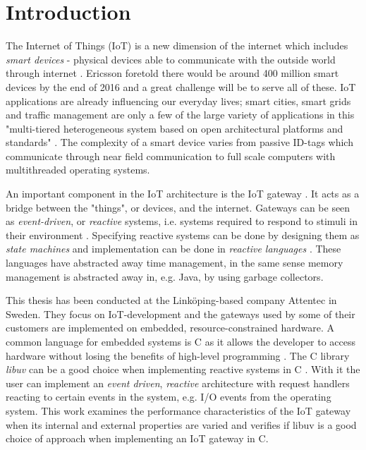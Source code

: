 \chapter{Introduction}
\label{cha:introduction}

The Internet of Things (IoT) is a new dimension of the internet which includes
\textit{smart devices} - physical devices able to communicate with the outside
world through internet
\cite{design-principles-for-distributed-embedded-applications}
\cite{wu2011m2m}. Ericsson foretold there would be around 400 million smart
devices by the end of 2016 \cite{ericsson-iot-forecast} and a great challenge
will be to serve all of these. IoT applications are already influencing our
everyday lives; smart cities, smart grids and traffic management are only a few
of the large variety of applications in this "multi-tiered heterogeneous system
based on open architectural platforms and standards" \cite{gardavsevic2017iot}.
The complexity of a smart device varies from passive ID-tags which communicate
through near field communication to full scale computers with multithreaded
operating systems.

An important component in the IoT architecture is the IoT gateway
\cite{chen2011brief}. It acts as a bridge between the "things", or devices, and
the internet. Gateways can be seen as \textit{event-driven}, or
\textit{reactive} systems, i.e. systems required to respond to stimuli in their
environment \cite{garlan1993introduction} \cite{harel1985development}.
Specifying reactive systems can be done by designing them as \textit{state
machines} and implementation can be done in \textit{reactive languages}
\cite{bainomugisha2013survey}. These languages have abstracted away time
management, in the same sense memory management is abstracted away in, e.g.
Java, by using garbage collectors.

This thesis has been conducted at the Linköping-based company Attentec in
Sweden. They focus on IoT-development and the gateways used by some of their
customers are implemented on embedded, resource-constrained hardware.  A common
language for embedded systems is C as it allows the developer to access
hardware without losing the benefits of high-level programming
\cite{nahas2012choosing} \cite{barr1999programming}. The C library
\textit{libuv} can be a good choice when implementing reactive systems in C
\cite{libuv-webpage}. With it the user can implement an \textit{event driven},
\textit{reactive} architecture with request handlers reacting to certain events
in the system, e.g. I/O events from the operating system. This work examines
the performance characteristics of the IoT gateway when its internal and
external properties are varied and verifies if libuv is a good choice of
approach when implementing an IoT gateway in C.

